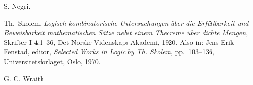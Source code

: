 \documentclass{fundam}
\begin{document}
\begin{thebibliography}{9}
S. Negri.

Th.~Skolem,
\newblock\emph{Logisch-kombinatorische Untersuchungen \"{u}ber
die Erf\"{u}llbarkeit %
und Beweisbarkeit mathematischen S\"{a}tze
nebst einem Theoreme \"{u}ber dichte Mengen},
{Skrifter} I \textbf{4}:1--36, Det Norske Videnskaps-Akademi, 1920.
\newblock Also in: Jens Erik Fenstad, editor,
\emph{Selected Works in Logic by Th. Skolem}, pp.~103--136,
Universitetsforlaget, Oslo, 1970.

G. C. Wraith

\end{thebibliography}
\end{document}
